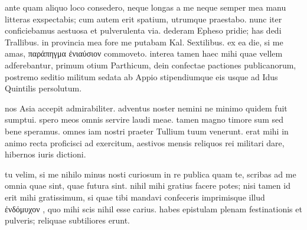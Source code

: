 


 ante quam aliquo loco consedero, neque longas a me neque semper mea manu litteras exspectabis; cum autem erit spatium, utrumque praestabo. nunc iter conficiebamus aestuosa et pulverulenta via. dederam Epheso pridie; has dedi Trallibus. in provincia mea fore me putabam Kal. Sextilibus. ex ea die, si me amas, παράπηγμα ἐνιαύσιον commoveto. interea tamen haec mihi quae vellem adferebantur, primum otium Parthicum, dein confectae pactiones publicanorum, postremo seditio militum sedata ab Appio stipendiumque eis usque ad Idus Quintilis persolutum.

 nos Asia accepit admirabiliter. adventus noster nemini ne minimo quidem fuit sumptui. spero meos omnis servire laudi meae. tamen magno timore sum sed bene speramus. omnes iam nostri praeter Tullium tuum venerunt. erat mihi in animo recta proficisci ad exercitum, aestivos mensis reliquos rei militari dare, hibernos iuris dictioni.

 tu velim, si me nihilo minus nosti curiosum in re publica quam te, scribas ad me omnia quae sint, quae futura sint. nihil mihi gratius facere potes; nisi tamen id erit mihi gratissimum, si quae tibi mandavi confeceris imprimisque illud ἐνδόμυχον , quo mihi scis nihil esse carius. habes epistulam plenam festinationis et pulveris; reliquae subtiliores erunt.
